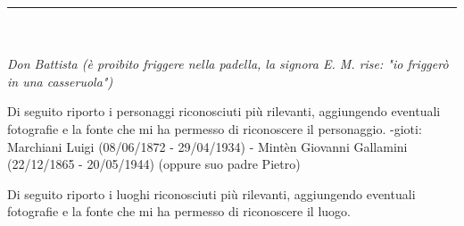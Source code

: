 \documentclass[10pt]{memoir} %
\begin{document}
\rule{1.5cm}{0.4pt}\\
\\
\emph{Don Battista (è proibito friggere nella padella, la signora E. M. rise: "io friggerò in una casseruola")}




\label{Personaggi}
Di seguito riporto i personaggi riconosciuti più rilevanti, aggiungendo eventuali fotografie e la fonte che mi ha permesso di riconoscere il personaggio.
-gioti: Marchiani Luigi (08/06/1872 - 29/04/1934)
- Mintèn Giovanni Gallamini (22/12/1865 - 20/05/1944) (oppure suo padre Pietro)
\renewcommand{\indexname}{Indice dei Personaggi}
\printindex[Personaggi]

\label{Luoghi}
Di seguito riporto i luoghi riconosciuti più rilevanti, aggiungendo eventuali fotografie e la fonte che mi ha permesso di riconoscere il luogo.
\renewcommand{\indexname}{Indice dei Luoghi}
\printindex[Luoghi]


\listoffigures

\end{document}

